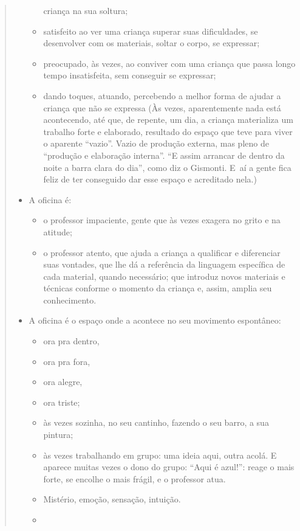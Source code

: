 \begin{quote}
\begin{itemize}
\begin{itemize}
    criança na sua soltura;
  \item
    satisfeito ao ver uma criança superar suas dificuldades, se
    desenvolver com os materiais, soltar o corpo, se expressar;
  \item
    preocupado, às vezes, ao conviver com uma criança que passa longo
    tempo insatisfeita, sem conseguir se expressar;
  \item
    dando toques, atuando, percebendo a melhor forma de ajudar a criança
    que não se expressa (Às vezes, aparentemente nada está acontecendo,
    até que, de repente, um dia, a criança materializa um trabalho forte
    e elaborado, resultado do espaço que teve para viver o aparente
    ``vazio''. Vazio de produção externa, mas pleno de ``produção e
    elaboração interna''. ``E assim arrancar de dentro da noite a barra
    clara do dia'', como diz o Gismonti. E~aí a gente fica feliz de ter
    conseguido dar esse espaço e acreditado nela.)
  \end{itemize}
\item
  A oficina é:
  \begin{itemize}
  \item
    o professor impaciente, gente que às vezes exagera no grito e na
    atitude;
  \item
    o professor atento, que ajuda a criança a qualificar e diferenciar
    suas vontades, que lhe dá a referência da linguagem específica de
    cada material, quando necessário; que introduz novos materiais e
    técnicas conforme o momento da criança e, assim, amplia seu
    conhecimento.
  \end{itemize}
\item
  A oficina é o espaço onde a  acontece no seu movimento
  espontâneo:
  \begin{itemize}
  \item
    ora pra dentro,
  \item
    ora pra fora,
  \item
    ora alegre,
  \item
    ora triste;
  \item
    às vezes sozinha, no seu cantinho, fazendo o seu barro, a sua
    pintura;
  \item
    às vezes trabalhando em grupo: uma ideia aqui, outra acolá. E
    aparece muitas vezes o dono do grupo: ``Aqui é azul!'': reage o mais
    forte, se encolhe o mais frágil, e o professor atua.
  \item
    Mistério, emoção, sensação, intuição.
  \item

\end{itemize}
\end{itemize}
\end{quote}
